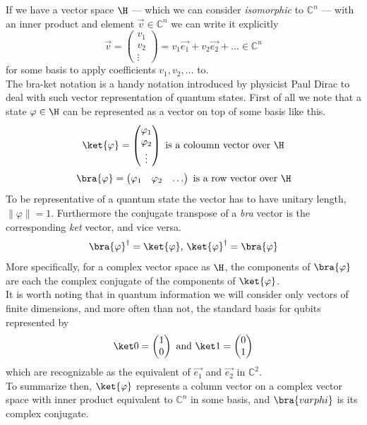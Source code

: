	 If we have a vector space $\H$ --- which we can consider \textit{isomorphic} to $\mathbb{C}^n $ --- with an inner product and element $\vec{v}\in \mathbb{C}^n$ we can write it explicitly 
	$$ \vec{v} =  \begin{pmatrix} v_1 \\ v_2 \\ \vdots \end{pmatrix} = v_1\vec{e_1} + v_2\vec{e_2} + \ldots \in \mathbb{C}^n$$
	for some basis to apply coefficients $v_1, v_2, \ldots$ to.\\
	The bra-ket notation is a handy notation introduced by physicist Paul Dirac to deal with such vector representation of quantum states. First of all we note that a state $\varphi\in\H$ can be represented as a vector on top of some basis like this.
	$$\ket{\varphi} = \begin{pmatrix} \varphi_1 \\ \varphi_2 \\ \vdots \end{pmatrix}	  \text{  is a coloumn vector over } \H $$
	$$\bra{\varphi}  = \begin{pmatrix} \varphi_1 & \varphi_2 & \hdots \end{pmatrix} \text{  is a row vector over } \H $$
	To be representative of a quantum state the vector has to have unitary length, $\|\varphi\|= 1$.
	Furthermore the conjugate transpose of a \emph{bra} vector is the corresponding \emph{ket} vector, and vice versa.
	$$ \bra{\varphi}^{\dagger} = \ket{\varphi} \text{,    } \ket{\varphi}^{\dagger} = \bra{\varphi}$$
	More specifically, for a complex vector space as $\H$, the components of $\bra{\varphi}$ are each the complex conjugate of the components of $\ket{\varphi}$.\\
	It is worth noting that in quantum information we will consider only vectors of finite dimensions, and more often than not, the standard basis for qubits represented by
	$$\ket0 =  \begin{pmatrix} 1 \\ 0 \end{pmatrix}
	\text{ and }
	\ket1 =  \begin{pmatrix} 0 \\ 1 \end{pmatrix}$$
	which are recognizable as the equivalent of $\vec{e_1}$ and $\vec{e_2}$ in $\mathbb{C}^2$.\\
	
	To summarize then, $\ket{\varphi}$ represents a column vector on a complex vector space with inner product equivalent to $\mathbb{C}^n$ in some basis, and $\bra{varphi}$ is its complex conjugate.
	
